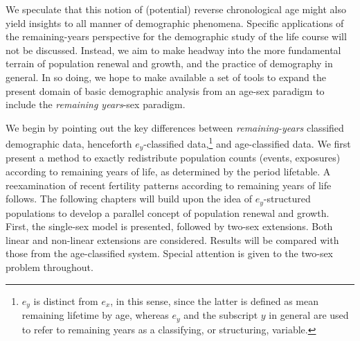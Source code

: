 We speculate that this notion of (potential) reverse chronological age might
also yield insights to all manner of demographic phenomena. Specific
applications of the remaining-years perspective for the demographic study 
of the life course will not be discussed. Instead, we aim to make headway into 
the more fundamental terrain of population renewal and growth, and the 
practice of demography in general.
In so doing, we hope to make available a set of tools to expand the present
domain of basic demographic analysis from an age-sex paradigm to include the
\textit{remaining years}-sex paradigm.

We begin by pointing out the key differences
between \textit{remaining-years} classified demographic data,
henceforth $e_y$-classified data,\footnote{$e_y$ is distinct from $e_x$, in
this sense, since the latter is defined as mean remaining lifetime by age,
whereas $e_y$ and the subscript $y$ in general are used to refer to
remaining years as a classifying, or structuring, variable.} and age-classified
data. We first present a method to exactly redistribute population 
counts (events, exposures) according to remaining years of life, as determined
by the period lifetable. A reexamination of recent fertility patterns according
to remaining years of life follows. The following chapters will build upon 
the idea of $e_y$-structured populations
to develop a parallel concept of population renewal and growth. First, the
single-sex model is presented, followed by two-sex extensions. Both linear and
non-linear extensions are considered. Results will be compared with those
from the age-classified system. Special attention is given to the two-sex
problem throughout.


